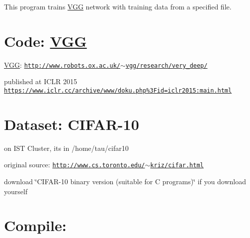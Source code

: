 This program trains \hyperlink{structVGG}{V\+GG} network with training data from a specified file.

\section*{Code\+: \hyperlink{structVGG}{V\+GG} }


\begin{DoxyItemize}
\item \hyperlink{structVGG}{V\+GG}\+: \href{http://www.robots.ox.ac.uk/~vgg/research/very_deep/}{\tt http\+://www.\+robots.\+ox.\+ac.\+uk/$\sim$vgg/research/very\+\_\+deep/}
\item published at I\+C\+LR 2015 \href{https://www.iclr.cc/archive/www/doku.php%3Fid=iclr2015:main.html}{\tt https\+://www.\+iclr.\+cc/archive/www/doku.\+php\%3\+Fid=iclr2015\+:main.\+html}
\end{DoxyItemize}

\section*{Dataset\+: C\+I\+F\+A\+R-\/10 }


\begin{DoxyItemize}
\item on I\+ST Cluster, it\textquotesingle{}s in /home/tau/cifar10
\item original source\+: \href{http://www.cs.toronto.edu/~kriz/cifar.html}{\tt http\+://www.\+cs.\+toronto.\+edu/$\sim$kriz/cifar.\+html}
\begin{DoxyItemize}
\item download \char`\"{}\+C\+I\+F\+A\+R-\/10 binary version (suitable for C programs)\char`\"{} if you download yourself
\end{DoxyItemize}
\end{DoxyItemize}

\section*{Compile\+: }




